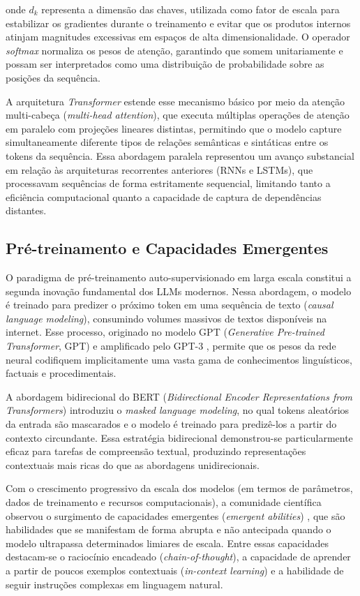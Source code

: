 \documentclass[
	12pt,				%
	openright,			%
	oneside,			%
	a4paper,			%
	tccpreliminar,		%
	]{ABNT-DC-UEL}
\begin{document}
\noindent onde $d_k$ representa a dimensão das chaves, utilizada como fator de escala para estabilizar os gradientes durante o treinamento e evitar que os produtos internos atinjam magnitudes excessivas em espaços de alta dimensionalidade. O operador \textit{softmax} normaliza os pesos de atenção, garantindo que somem unitariamente e possam ser interpretados como uma distribuição de probabilidade sobre as posições da sequência.

A arquitetura \textit{Transformer} estende esse mecanismo básico por meio da atenção multi-cabeça (\textit{multi-head attention}), que executa múltiplas operações de atenção em paralelo com projeções lineares distintas, permitindo que o modelo capture simultaneamente diferente tipos de relações semânticas e sintáticas entre os tokens da sequência. Essa abordagem paralela representou um avanço substancial em relação às arquiteturas recorrentes anteriores (RNNs e LSTMs), que processavam sequências de forma estritamente sequencial, limitando tanto a eficiência computacional quanto a capacidade de captura de dependências distantes.

\subsection{Pré-treinamento e Capacidades Emergentes}

O paradigma de pré-treinamento auto-supervisionado em larga escala constitui a segunda inovação fundamental dos LLMs modernos. Nessa abordagem, o modelo é treinado para predizer o próximo token em uma sequência de texto (\textit{causal language modeling}), consumindo volumes massivos de textos disponíveis na internet. Esse processo, originado no modelo GPT (\textit{Generative Pre-trained Transformer}, GPT) \cite{radford2018gpt1} e amplificado pelo GPT-3 \cite{brown2020fewshot}, permite que os pesos da rede neural codifiquem implicitamente uma vasta gama de conhecimentos linguísticos, factuais e procedimentais.

A abordagem bidirecional do BERT (\textit{Bidirectional Encoder Representations from Transformers}) \cite{devlin2019bert} introduziu o \textit{masked language modeling}, no qual tokens aleatórios da entrada são mascarados e o modelo é treinado para predizê-los a partir do contexto circundante. Essa estratégia bidirecional demonstrou-se particularmente eficaz para tarefas de compreensão textual, produzindo representações contextuais mais ricas do que as abordagens unidirecionais.

Com o crescimento progressivo da escala dos modelos (em termos de parâmetros, dados de treinamento e recursos computacionais), a comunidade científica observou o surgimento de capacidades emergentes (\textit{emergent abilities}) \cite{wei2022emergent}, que são habilidades que se manifestam de forma abrupta e não antecipada quando o modelo ultrapassa determinados limiares de escala. Entre essas capacidades destacam-se o raciocínio encadeado (\textit{chain-of-thought}), a capacidade de aprender a partir de poucos exemplos contextuais (\textit{in-context learning}) e a habilidade de seguir instruções complexas em linguagem natural.
\end{document}
